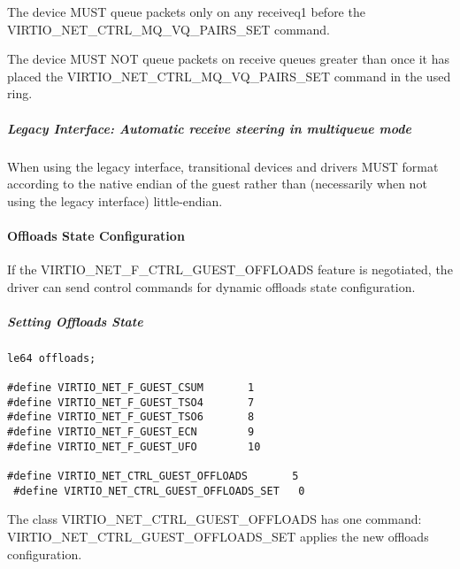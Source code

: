 
The device MUST queue packets only on any receiveq1 before the 
VIRTIO_NET_CTRL_MQ_VQ_PAIRS_SET command.

The device MUST NOT queue packets on receive queues greater than
 once it has placed the VIRTIO_NET_CTRL_MQ_VQ_PAIRS_SET command in the used ring.

\subparagraph{Legacy Interface: Automatic receive steering in multiqueue mode}\label{sec:Device Types / Network Device / Device Operation / Control Virtqueue / Automatic receive steering in multiqueue mode / Legacy Interface: Automatic receive steering in multiqueue mode}
When using the legacy interface, transitional devices and drivers
MUST format 
according to the native endian of the guest rather than
(necessarily when not using the legacy interface) little-endian.

\paragraph{Offloads State Configuration}\label{sec:Device Types / Network Device / Device Operation / Control Virtqueue / Offloads State Configuration}

If the VIRTIO_NET_F_CTRL_GUEST_OFFLOADS feature is negotiated, the driver can
send control commands for dynamic offloads state configuration.

\subparagraph{Setting Offloads State}\label{sec:Device Types / Network Device / Device Operation / Control Virtqueue / Offloads State Configuration / Setting Offloads State}

\begin{lstlisting}
le64 offloads;

#define VIRTIO_NET_F_GUEST_CSUM       1
#define VIRTIO_NET_F_GUEST_TSO4       7
#define VIRTIO_NET_F_GUEST_TSO6       8
#define VIRTIO_NET_F_GUEST_ECN        9
#define VIRTIO_NET_F_GUEST_UFO        10

#define VIRTIO_NET_CTRL_GUEST_OFFLOADS       5
 #define VIRTIO_NET_CTRL_GUEST_OFFLOADS_SET   0
\end{lstlisting}

The class VIRTIO_NET_CTRL_GUEST_OFFLOADS has one command:
VIRTIO_NET_CTRL_GUEST_OFFLOADS_SET applies the new offloads configuration.

